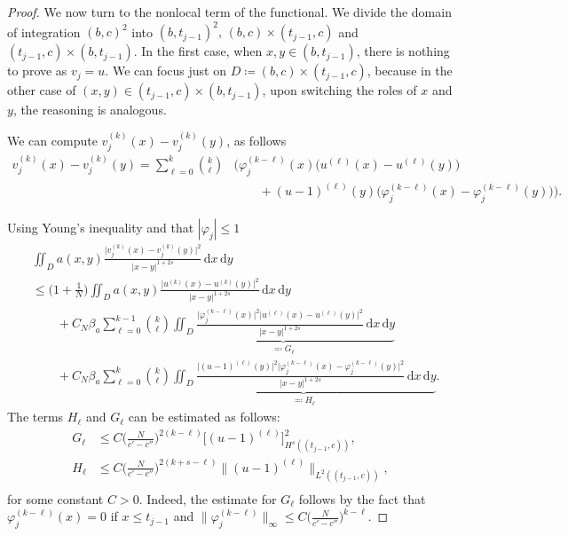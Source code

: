 \documentclass{article}
\theoremstyle{definition}
\newcommand{\de}{\mathrm{d}}
\let\phi\varphi
\let\l\ell
\begin{document}
\begin{proof}
We now turn to the nonlocal term of the functional.  We divide the domain of integration $(b,c)^2$ into $(b,t_{j-1})^2,\, (b,c)\times (t_{j-1},c)$ and $(t_{j-1},c) \times (b,t_{j-1})$. 
In the first case, when $x,y \in (b,t_{j-1})$, there is nothing to prove as $v_j=u$.
We can focus just on $D\coloneqq (b,c)\times (t_{j-1},c)$, because in the other case of $(x,y)\in(t_{j-1},c)\times(b,t_{j-1})$, upon switching the roles of $x$ and $y$, the reasoning is analogous.

We can compute $v_j^{(k)}(x)-v_j^{(k)}(y)$, as follows
\begin{equation*}
    \begin{split}
         v_j^{(k)}(x) - v_j^{(k)}(y)  =\sum_{\l=0}^{k}\binom{k}{\l}
     &\Big( \phi_j^{(k-\l)}(x)\big(u^{(\l)}(x)- u^{(\l)}(y)\big) \\
     &\qquad + (u-1)^{(\l)}(y)\big(\phi_j^{(k-\l)}(x)-\phi_j^{(k-\l)}(y)\big)\Big) .
    \end{split}
\end{equation*}

Using Young's inequality and that $|\phi_j|\leq 1$
\begin{equation}\label{eq:vj_estimate_decomposition}
    \begin{split}
         &\iint_{D}a(x,y)\frac{\big|v_j^{(k)}(x)-v_j^{(k)}(y)\big|^2}{|x-y|^{1+2s}}\,\de x\,\de y \\
         & \leq\Big(1+\frac{1}{N}\Big)\iint_{D} a(x,y)\frac{\big|u^{(k)}(x)-u^{(k)}(y)\big|^2}{|x-y|^{1+2s}}\,\de x\,\de y \\
         &\qquad+ C_N\beta_a \sum_{\ell=0}^{k-1}\binom{k}{\l} \underbrace{\iint_{D}\frac{\big|\phi_j^{(k-\l)}(x)\big|^2\big|u^{(\l)}(x)-  u^{(\l)}(y) \big|^2}{|x-y|^{1+2s}} \,\de x\,\de y}_{\eqqcolon G_\l}  \\ 
         &\qquad+ C_N\beta_a \sum_{\ell=0}^{k}\binom{k}{\l} \underbrace{\iint_{D}\frac{  \big|(u-1)^{(\l)}(y)\big|^2\big|\phi_j^{(k-\l)}(x)-\phi_j^{(k-\l)}(y) \big|^2}{|x-y|^{1+2s}} \,\de x\,\de y}_{\eqqcolon H_\l}.
    \end{split}
\end{equation}
The terms $H_\ell$ and $G_\ell$ can be estimated as follows:
\begin{equation}\label{ineq:Hl_Gl}
  \begin{split}
    G_\l &\leq C\bigg(\frac{N}{c'-c''}\bigg)^{2(k -\l)} \big[(u-1)^{(\l)}\big]^2_{H^s((t_{j-1},c))}, \\
      H_\l &\leq C \bigg(\frac{N}{c'-c''}\bigg)^{2(k+s-\l)}\big\| (u-1)^{(\l)}\big \|_{L^2((t_{j-1}, c))},\\
  \end{split}  
\end{equation} 
for some constant $C>0$.
Indeed, the estimate for $G_\l$ follows by the fact that $\phi_j^{(k-\ell)}(x) = 0$ if $x\leq t_{j-1}$ and $\|\phi_j^{(k-\l)}\|_\infty \leq C\big(\frac{N}{c'-c''}\big)^{k-\l}$. 


\end{proof}
\end{document}
